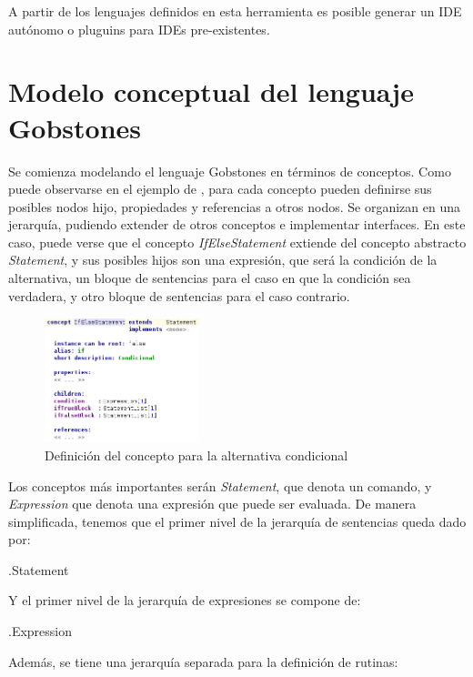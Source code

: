 A partir de los lenguajes definidos en esta herramienta es posible generar un IDE autónomo o pluguins para IDEs pre-existentes.

\section{Modelo conceptual del lenguaje Gobstones}

Se comienza modelando el lenguaje Gobstones en términos de conceptos. Como puede observarse en el ejemplo de , para cada concepto pueden definirse sus posibles nodos hijo, propiedades y referencias a otros nodos. Se organizan en una jerarquía, pudiendo extender de otros conceptos e implementar interfaces. En este caso, puede verse que el concepto \textit{IfElseStatement} extiende del concepto abstracto \textit{Statement}, y sus posibles hijos son una expresión, que será la condición de la alternativa, un bloque de sentencias para el caso en que la condición sea verdadera, y otro bloque de sentencias para el caso contrario.

\begin{figure}[hb]
\centering
\includegraphics[width=0.4\textwidth]{assets/ifElse_concept}
\caption{Definición del concepto para la alternativa condicional}
\label{fig:ifElse_concept}
\end{figure}

Los conceptos más importantes serán \textit{Statement}, que denota un comando, y \textit{Expression} que denota una expresión que puede ser evaluada. De manera simplificada, tenemos que el primer nivel de la jerarquía de sentencias queda dado por:

.Statement 
\bigskip

Y el primer nivel de la jerarquía de expresiones se compone de:

.Expression 
\bigskip

Además, se tiene una jerarquía separada para la definición de rutinas:

